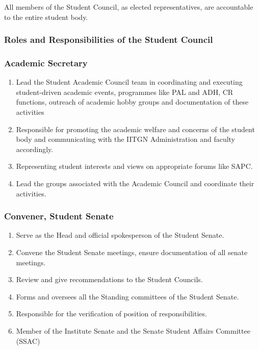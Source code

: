 \documentclass[12pt]{article}
\begin{document}
\noindent All members of the Student Council, as elected representatives, are accountable to the entire student body.

\subsubsection{Roles and Responsibilities of the Student Council}
\subsubsection*{Academic Secretary}
\begin{enumerate}
    \item Lead the Student Academic Council team in coordinating and executing student-driven academic events, programmes like PAL and ADH, CR functions, outreach of academic hobby groups and documentation of these activities
    \item Responsible for promoting the academic welfare and concerns of the student body and communicating with the IITGN Administration and faculty accordingly.
    \item Representing student interests and views on appropriate forums like SAPC.
    \item Lead the groups associated with the Academic Council and coordinate their activities.
\end{enumerate}


\subsubsection*{Convener, Student Senate}
\begin{enumerate}
    \item Serve as the Head and official spokesperson of the Student Senate.
    \item Convene the Student Senate meetings, ensure documentation of all senate meetings.
    \item Review and give recommendations to the Student Councils.
    \item Forms and oversees all the Standing committees of the Student Senate.
    \item Responsible for the verification of position of responsibilities.
    \item Member of the Institute Senate and the Senate Student Affairs Committee (SSAC)
\end{enumerate}
\end{document}
